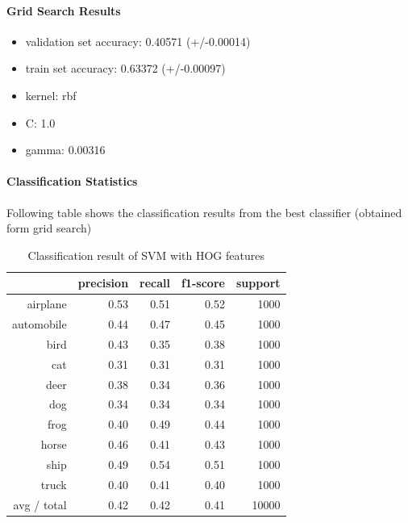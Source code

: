 \documentclass[12pt]{article}
\begin{document}
\paragraph{Grid Search Results}
\begin{itemize}
\item validation set accuracy: 0.40571 (+/-0.00014)
\item train set accuracy: 0.63372 (+/-0.00097)
\item kernel: rbf
\item C: 1.0
\item gamma: 0.00316
\end{itemize}
\paragraph{Classification Statistics}
Following table shows the classification results from the best classifier (obtained form grid search) \\
\begin{table}[H]
\centering
\begin{tabular}{| r | r | r | r | r |}
\hline
    & precision &   recall & f1-score &  support\\
 \hline
   airplane  &     0.53    &  0.51 &     0.52    &  1000\\
 automobile   &    0.44  &    0.47   &   0.45  &    1000\\
       bird     &  0.43  &    0.35 &     0.38   &   1000\\
        cat     &  0.31  &    0.31   &   0.31  &    1000\\
       deer   &    0.38   &   0.34 &     0.36   &   1000\\
        dog    &   0.34   &   0.34   &   0.34  &    1000\\
       frog   &    0.40   &   0.49    &  0.44   &   1000\\
      horse &      0.46  &    0.41  &    0.43  &    1000\\
       ship    &   0.49   &   0.54    &  0.51   &   1000\\
      truck    &   0.40  &    0.41    &  0.40  &    1000\\
\hline
avg / total    &   0.42    &  0.42    &  0.41   &  10000\\
\hline
\end{tabular}
\caption{Classification result of SVM with HOG features}
\label{tab:svm_cs_hog}
\end{table}
\end{document}
